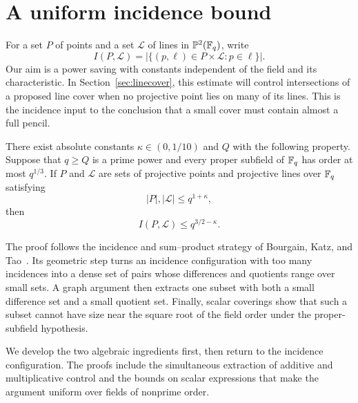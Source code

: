 \section{A uniform incidence bound}\label{sec:incidence}

For a set $P$ of points and a set $\mathcal L$ of lines in
$\mathbb P^2(\mathbb F_q)$, write
\begin{equation}\label{eq:inc-definition}
 I(P,\mathcal L)
 =\bigl|\{(p,\ell)\in P\times\mathcal L:p\in\ell\}\bigr|.
\end{equation}
Our aim is a power saving with constants independent of the field and
its characteristic. In Section~\ref{sec:linecover}, this estimate will
control intersections of a proposed line cover when no projective point
lies on many of its lines. This is the incidence input to the conclusion
that a small cover must contain almost a full pencil.

\begin{theorem}\label{thm:incidence}
There exist absolute constants $\kappa\in(0,1/10)$ and $Q$ with the following
property. Suppose that $q\ge Q$ is a prime power and every proper subfield
of $\mathbb F_q$ has order at most $q^{1/3}$. If $P$ and $\mathcal L$ are sets of
projective points and projective lines over $\mathbb F_q$ satisfying
\begin{equation}\label{eq:inc-theorem-sizes}
 |P|,|\mathcal L|\le q^{1+\kappa},
\end{equation}
then
\begin{equation}\label{eq:inc-theorem-bound}
 I(P,\mathcal L)\le q^{3/2-\kappa}.
\end{equation}
\end{theorem}

The proof follows the incidence and sum--product strategy of
Bourgain, Katz, and Tao~\cite[Sections 3--4 and 6]{BKT2004}. Its geometric
step turns an incidence configuration with too many incidences into a
dense set of pairs whose differences and quotients range over small
sets. A graph argument then extracts one subset with both a small
difference set and a small quotient set. Finally, scalar coverings show
that such a subset cannot have size near the square root of the field
order under the proper-subfield hypothesis.

We develop the two algebraic ingredients first, then return to the
incidence configuration. The proofs include the simultaneous extraction
of additive and multiplicative control and the bounds on scalar
expressions that make the argument uniform over fields of nonprime
order.

